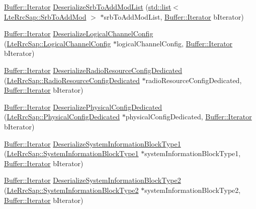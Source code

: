 \begin{DoxyCompactItemize}
\item 
\hyperlink{classns3_1_1Buffer_1_1Iterator}{Buffer\+::\+Iterator} \hyperlink{classns3_1_1RrcAsn1Header_af7a6d8ce57df3b35dc2ec29a4850b79c}{Deserialize\+Srb\+To\+Add\+Mod\+List} (\hyperlink{openflow-interface_8h_afd9bcfa176617760671b67580f536fa7}{std\+::list}$<$ \hyperlink{structns3_1_1LteRrcSap_1_1SrbToAddMod}{Lte\+Rrc\+Sap\+::\+Srb\+To\+Add\+Mod} $>$ $\ast$srb\+To\+Add\+Mod\+List, \hyperlink{classns3_1_1Buffer_1_1Iterator}{Buffer\+::\+Iterator} b\+Iterator)
\item 
\hyperlink{classns3_1_1Buffer_1_1Iterator}{Buffer\+::\+Iterator} \hyperlink{classns3_1_1RrcAsn1Header_a2391dd6be784d7a4886d3d70bc8718b4}{Deserialize\+Logical\+Channel\+Config} (\hyperlink{structns3_1_1LteRrcSap_1_1LogicalChannelConfig}{Lte\+Rrc\+Sap\+::\+Logical\+Channel\+Config} $\ast$logical\+Channel\+Config, \hyperlink{classns3_1_1Buffer_1_1Iterator}{Buffer\+::\+Iterator} b\+Iterator)
\item 
\hyperlink{classns3_1_1Buffer_1_1Iterator}{Buffer\+::\+Iterator} \hyperlink{classns3_1_1RrcAsn1Header_abafc8885597eb46dfaea4bc5a715b00d}{Deserialize\+Radio\+Resource\+Config\+Dedicated} (\hyperlink{structns3_1_1LteRrcSap_1_1RadioResourceConfigDedicated}{Lte\+Rrc\+Sap\+::\+Radio\+Resource\+Config\+Dedicated} $\ast$radio\+Resource\+Config\+Dedicated, \hyperlink{classns3_1_1Buffer_1_1Iterator}{Buffer\+::\+Iterator} b\+Iterator)
\item 
\hyperlink{classns3_1_1Buffer_1_1Iterator}{Buffer\+::\+Iterator} \hyperlink{classns3_1_1RrcAsn1Header_a32dfda6b17e399d6727f7a16e48399ed}{Deserialize\+Physical\+Config\+Dedicated} (\hyperlink{structns3_1_1LteRrcSap_1_1PhysicalConfigDedicated}{Lte\+Rrc\+Sap\+::\+Physical\+Config\+Dedicated} $\ast$physical\+Config\+Dedicated, \hyperlink{classns3_1_1Buffer_1_1Iterator}{Buffer\+::\+Iterator} b\+Iterator)
\item 
\hyperlink{classns3_1_1Buffer_1_1Iterator}{Buffer\+::\+Iterator} \hyperlink{classns3_1_1RrcAsn1Header_ac63bc948e0d48d46dae3154c78d4c9f7}{Deserialize\+System\+Information\+Block\+Type1} (\hyperlink{structns3_1_1LteRrcSap_1_1SystemInformationBlockType1}{Lte\+Rrc\+Sap\+::\+System\+Information\+Block\+Type1} $\ast$system\+Information\+Block\+Type1, \hyperlink{classns3_1_1Buffer_1_1Iterator}{Buffer\+::\+Iterator} b\+Iterator)
\item 
\hyperlink{classns3_1_1Buffer_1_1Iterator}{Buffer\+::\+Iterator} \hyperlink{classns3_1_1RrcAsn1Header_ac76e61e534e302566ccb9771f19498df}{Deserialize\+System\+Information\+Block\+Type2} (\hyperlink{structns3_1_1LteRrcSap_1_1SystemInformationBlockType2}{Lte\+Rrc\+Sap\+::\+System\+Information\+Block\+Type2} $\ast$system\+Information\+Block\+Type2, \hyperlink{classns3_1_1Buffer_1_1Iterator}{Buffer\+::\+Iterator} b\+Iterator)

\end{DoxyCompactItemize}
